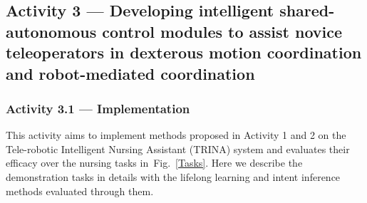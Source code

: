 \documentclass[letterpaper, 11 pt, onecolumn]{article}
\newcommand{\fig}[1]{Fig.~\ref{#1}}
\begin{document}

\subsection{Activity 3 --- Developing intelligent shared-autonomous control modules to assist novice teleoperators in dexterous motion coordination and robot-mediated coordination}\label{sec:plan-evaluation}
\noindent

\noindent

\subsubsection{Activity 3.1 --- Implementation}\label{sec:plan-evaluation-implementation}
This activity aims to implement methods proposed in Activity 1 and 2 on the Tele-robotic Intelligent Nursing Assistant (TRINA) system and evaluates their efficacy over the nursing tasks in~\fig{Tasks}. Here we describe the demonstration tasks in details with the lifelong learning and intent inference methods evaluated through them. 
\end{document}
